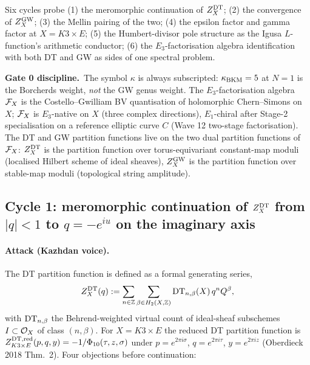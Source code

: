 Six cycles probe (1) the meromorphic continuation of $Z^{\mathrm{DT}}_X$;
(2) the convergence of $Z^{\mathrm{GW}}_X$; (3) the Mellin pairing of the
two; (4) the epsilon factor and gamma factor at $X=K3\times E$;
(5) the Humbert-divisor pole structure as the Igusa
$L$-function's arithmetic conductor; (6) the $E_3$-factorisation
algebra identification with both DT and GW as sides of one
spectral problem.

\medskip
\noindent\textbf{Gate 0 discipline.}\ The symbol $\kappa$ is
always subscripted: $\kappa_{\mathrm{BKM}}=5$ at $N=1$ is the Borcherds weight,
\emph{not} the GW genus weight. The $E_3$-factorisation algebra
$\mathcal{F}_X$ is the Costello--Gwilliam BV quantisation of holomorphic
Chern--Simons on $X$; $\mathcal{F}_X$ is $E_3$-native on $X$ (three
complex directions), $E_1$-chiral after Stage-2 specialisation on
a reference elliptic curve $C$ (Wave 12 two-stage factorisation).
The DT and GW partition functions live on the two dual partition
functions of $\mathcal{F}_X$: $Z^{\mathrm{DT}}_X$ is the partition function over
torus-equivariant constant-map moduli (localised Hilbert scheme
of ideal sheaves), $Z^{\mathrm{GW}}_X$ is the partition function over
stable-map moduli (topological string amplitude).

\subsection*{Cycle 1: meromorphic continuation of $Z^{\mathrm{DT}}_X$ from
$|q|<1$ to $q=-e^{iu}$ on the imaginary axis}
\label{sec:w14a14-cycle-1}

\paragraph{Attack (Kazhdan voice).}
The DT partition function is defined as a formal generating
series,
\[
Z^{\mathrm{DT}}_X(q):=\sum_{n\in\mathbb{Z}}\sum_{\beta\in H_2(X,\mathbb{Z})}
\mathrm{DT}_{n,\beta}(X)\,q^n Q^\beta,
\]
with $\mathrm{DT}_{n,\beta}$ the Behrend-weighted virtual count of
ideal-sheaf subschemes $I\subset\mathcal{O}_X$ of class $(n,\beta)$. For
$X=K3\times E$ the reduced DT partition function is
$Z^{\mathrm{DT},\mathrm{red}}_{K3\times E}(p,q,y)=-1/\Phi_{10}(\tau,z,\sigma)$
under $p=e^{2\pi i\sigma}$, $q=e^{2\pi i\tau}$, $y=e^{2\pi iz}$
(Oberdieck 2018 Thm.\ 2). Four objections before continuation:

